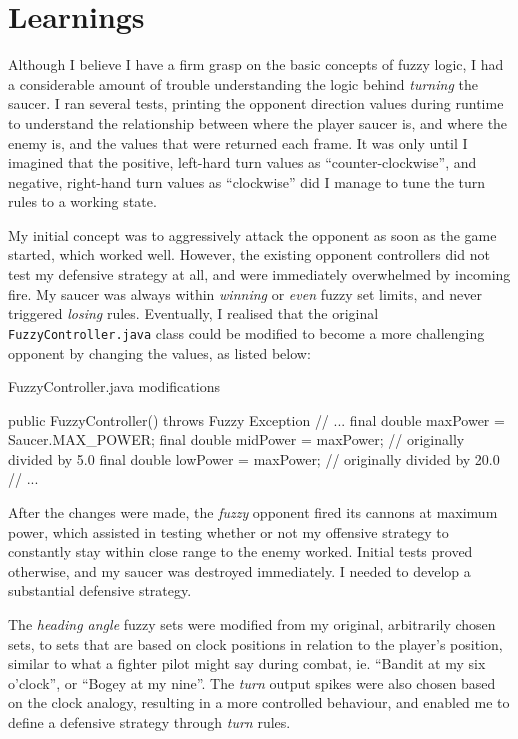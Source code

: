 \newpage

\section{Learnings}

Although I believe I have a firm grasp on the basic concepts of fuzzy logic, I had a considerable amount of trouble understanding the logic behind \emph{turning} the saucer. I ran several tests, printing the opponent direction values during runtime to understand the relationship between where the player saucer is, and where the enemy is, and the values that were returned each frame. It was only until I imagined that the positive, left-hard turn values as ``counter-clockwise'', and negative, right-hand turn values as ``clockwise'' did I manage to tune the turn rules to a working state.

My initial concept was to aggressively attack the opponent as soon as the game started, which worked well. However, the existing opponent controllers did not test my defensive strategy at all, and were immediately overwhelmed by incoming fire. My saucer was always within \emph{winning} or \emph{even} fuzzy set limits, and never triggered \emph{losing} rules. Eventually, I realised that the original \texttt{FuzzyController.java} class could be modified to become a more challenging opponent by changing the values, as listed below:

\begin{listing}[H]
\caption{FuzzyController.java modifications}

\begin{javacode}
public FuzzyController() throws Fuzzy Exception {
  // ...
  final double maxPower = Saucer.MAX_POWER;
  final double midPower = maxPower; // originally divided by 5.0
  final double lowPower = maxPower; // originally divided by 20.0
  // ...
}
\end{javacode}
\end{listing}

After the changes were made, the \emph{fuzzy} opponent fired its cannons at maximum power, which assisted in testing whether or not my offensive strategy to constantly stay within close range to the enemy worked. Initial tests proved otherwise, and my saucer was destroyed immediately. I needed to develop a substantial defensive strategy.

The \emph{heading angle} fuzzy sets were modified from my original, arbitrarily chosen sets, to sets that are based on clock positions in relation to the player's position, similar to what a fighter pilot might say during combat, ie. ``Bandit at my six o'clock'', or ``Bogey at my nine''. The \emph{turn} output spikes were also chosen based on the clock analogy, resulting in a more controlled behaviour, and enabled me to define a defensive strategy through \emph{turn} rules.

